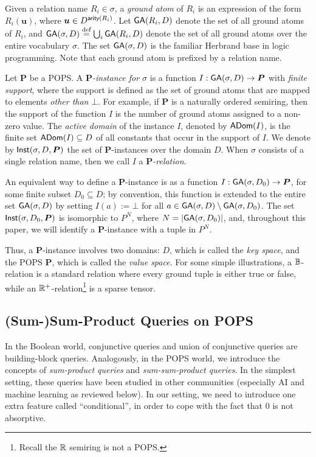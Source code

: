 Given a relation name $R_i \in \sigma$, a {\em ground atom} of $R_i$
is an expression of the form $R_i(\bm u)$, where
$\bm u \in D^{\textsf{arity}(R_i)}$.  Let $\textsf{GA}(R_i,D)$ denote the set of
all ground atoms of $R_i$, and
$\textsf{GA}(\sigma, D) \stackrel{\text{def}}{=} \bigcup_i \textsf{GA}(R_i,D)$ denote the set of
all ground atoms over the entire vocabulary $\sigma$.  The set
$\textsf{GA}(\sigma, D)$ is the familiar Herbrand base in logic
programming.  Note that each ground atom is prefixed by a relation
name.

Let $\bm P$ be a POPS.  A {\em $\bm P$-instance for $\sigma$} is a function
$I : \textsf{GA}(\sigma, D) \rightarrow \bm P$ with {\em finite support},
where the support is defined as the set of ground atoms that are
mapped to elements {\em other than} $\bot$.
For example, if $\bm P$ is a naturally ordered semiring, then the support of the function
$I$ is the number of ground atoms assigned to a non-zero value.
The {\em active domain} of the instance $I$,
denoted by $\textsf{ADom}(I)$, is the finite set $\textsf{ADom}(I) \subseteq D$ of all constants that occur
in the support of $I$.  We denote by $\textsf{Inst}(\sigma, D, \bm P)$ the set
of $\bm P$-instances over the domain $D$.  When $\sigma$ consists of a
single relation name, then we call $I$ a {\em $\bm P$-relation}.

An equivalent way to define a $\bm P$-instance is as a function
$I : \textsf{GA}(\sigma, D_0) \rightarrow \bm P$, for some finite subset
$D_0 \subseteq D$; by convention, this function is extended to the
entire set $\textsf{GA}(\sigma, D)$ by setting $I(a) := \bot$ for all
$a \in \textsf{GA}(\sigma,D) \setminus \textsf{GA}(\sigma,D_0)$.  The set
$\textsf{Inst}(\sigma, D_0, \bm P)$ is isomorphic to $P^N$, where
$N=|\textsf{GA}(\sigma, D_0)|$, and, throughout this paper, we will
identify a $\bm P$-instance with a tuple in $P^N$.

Thus, a $\bm P$-instance involves two domains: $D$, which is called
the {\em key space}, and the POPS $\bm P$, which is called the {\em
  value space}.  For some simple illustrations, a $\mathbb B$-relation is a
standard relation where every ground tuple is either true or false,
while an $\mathbb R^+$-relation\footnote{Recall the $\mathbb R$ semiring is not a POPS.} is a sparse tensor.

\subsection{(Sum-)Sum-Product Queries on POPS}
\label{subsec:sum-products}

In the Boolean world, conjunctive queries and union of conjunctive
queries are building-block queries.  Analogously, in the POPS world,
we introduce the concepts of {\em sum-product queries} and {\em
  sum-sum-product queries}.
In the simplest setting, these queries
have been studied in other communities (especially AI and machine
learning as reviewed below).  In our setting, we need to introduce one
extra feature called ``conditional'', in order to cope with the fact
that $0$ is not absorptive.

